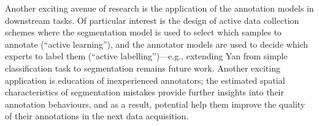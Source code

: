 Another exciting avenue of research is the application of the annotation models in downstream tasks. Of particular interest is the design of active data collection schemes where the segmentation model is used to select which samples to annotate (``active learning''), and the annotator models are used to decide which experts to label them (``active labelling'')---e.g., extending Yan \etal \cite{yan2011active} from simple classification task to segmentation remains future work. Another exciting application is education of inexperienced annotators; the estimated spatial characteristics of segmentation mistakes provide further insights into their annotation behaviours, and as a result, potential help them improve the quality of their annotations in the next data acquisition. 

%
%
%
%
%
%
%
%
%
